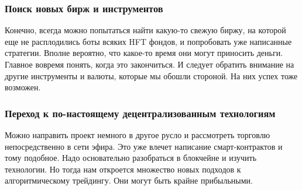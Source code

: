 \subsubsection{Поиск новых бирж и инструментов}
Конечно, всегда можно попытаться найти какую-то свежую биржу, на которой еще не расплодились боты всяких HFT фондов, и попробовать уже написанные стратегии. Вполне вероятно, что какое-то время они могут приносить деньги. Главное вовремя понять, когда это закончиться. И следует обратить внимание на другие инструменты и валюты, которые мы обошли стороной. На них успех тоже возможен.

\subsubsection{Переход к по-настоящему децентрализованным технологиям}
Можно направить проект немного в другое русло и рассмотреть торговлю непосредственно в сети эфира. Это уже влечет написание смарт-контрактов и тому подобное. Надо основательно разобраться в блокчейне и изучить технологии. Но тогда нам откроется множество новых подходов к алгоритмическому трейдингу. Они могут быть крайне прибыльными.
    
